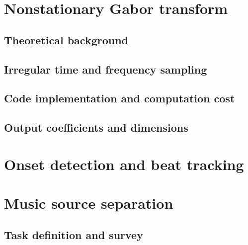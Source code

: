 \documentclass[letter,12pt,notitlepage]{article}
\begin{document}
\vfill
\clearpage

\section{Nonstationary Gabor transform}
\label{sec:theorynsgt}

\subsection{Theoretical background}


\subsection{Irregular time and frequency sampling}


\subsection{Code implementation and computation cost}


\subsection{Output coefficients and dimensions}


\vfill
\clearpage

\section{Onset detection and beat tracking}
\label{sec:beattrack}

\vfill
\clearpage

\section{Music source separation}
\label{sec:musicsep}

\subsection{Task definition and survey}
\end{document}
